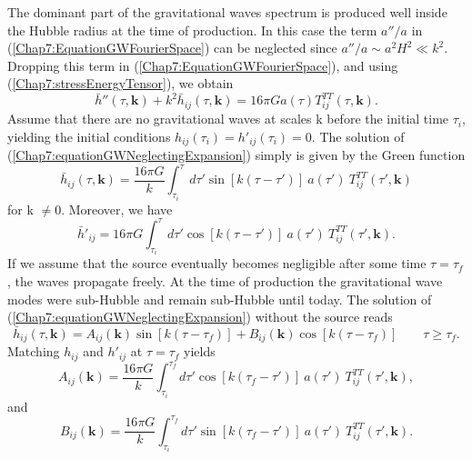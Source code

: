 \documentclass[11pt,a4paper,twoside]{book}
\begin{document}
The dominant part of the gravitational waves spectrum is produced well inside the Hubble radius at the time of production. In this case the term $ a''/a $ in (\ref{Chap7:EquationGWFourierSpace}) can be neglected since $ a''/a  \sim a^{2}H^{2} \ll k^{2}$. Dropping this term in (\ref{Chap7:EquationGWFourierSpace}), and using (\ref{Chap7:stressEnergyTensor}), we obtain
\begin{equation}
\label{Chap7:equationGWNeglectingExpansion}
\bar{h}''(\tau,\textbf{k}) + k^{2}\bar{h}_{ij}(\tau,\textbf{k}) = 16\pi G a(\tau) T^{TT}_{ij}(\tau,\textbf{k}).
\end{equation}
Assume that there are no gravitational waves at  scales k before the initial time $\tau_{i}$, yielding the initial conditions $ h_{ij}(\tau_{i})=h'_{ij}(\tau_{i}) =0 $. The solution of (\ref{Chap7:equationGWNeglectingExpansion}) simply is given by the Green function
\begin{equation}
\label{Chap7:solutionhijGreenFunction}
\bar{h}_{ij}(\tau,\textbf{k}) = \frac{16\pi G}{k}\int^{\tau}_{\tau_{i}} d\tau' \sin [k(\tau - \tau')]\  a(\tau')\ T^{TT}_{ij}(\tau',\textbf{k})
\end{equation}
for k $\neq$0. Moreover, we have
\begin{equation}
\label{Chap7:derivativehij}
\bar{h}'_{ij}=16\pi G \int_{\tau_{i}}^{\tau} d\tau'\cos[k(\tau-\tau')]\ a(\tau')\ T_{ij}^{TT}(\tau', \textbf{k}).
\end{equation}
If we assume that the source eventually becomes negligible after some time $ \tau = \tau_{f} $, the waves propagate freely. At the time of production the gravitational wave modes  were sub-Hubble and remain sub-Hubble until today. The solution of (\ref{Chap7:equationGWNeglectingExpansion}) without the source reads
\begin{equation}
\label{Chap7:solutionhWithoutSource}
\bar{h}_{ij}(\tau,\textbf{k}) = A_{ij}(\textbf{k})\sin[k(\tau-\tau_{f})] + B_{ij}(\textbf{k})\cos[k(\tau-\tau_{f})]
\qquad
\tau \ge \tau_{f}.
\end{equation}
Matching $ h_{ij} $ and $ h'_{ij} $ at $ \tau=\tau_{f} $ yields
\begin{equation}
\label{Chap7:ExpressionA}
A_{ij}(\textbf{k}) = \frac{16\pi G}{k}\int_{\tau_{i}}^{\tau_{f}} d\tau'\cos[k(\tau_{f}-\tau')]\ a(\tau')\ T_{ij}^{TT}(\tau', \textbf{k}),
\end{equation}
and
\begin{equation}
	\label{Chap7:ExpressionB}
	B_{ij}(\textbf{k}) = \frac{16\pi G}{k}\int_{\tau_{i}}^{\tau_{f}} d\tau'\sin[k(\tau_{f}-\tau')]\ a(\tau')\ T_{ij}^{TT}(\tau', \textbf{k}).
\end{equation}
\end{document}

